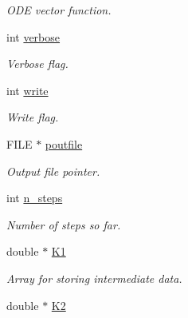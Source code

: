 \begin{DoxyCompactItemize}
\begin{DoxyCompactList}\small\item\em O\+D\+E vector function. \end{DoxyCompactList}\item 
\hypertarget{structrk4_af11a7c143fbea8168fb9d5d5c259e05e}{}int \hyperlink{structrk4_af11a7c143fbea8168fb9d5d5c259e05e}{verbose}\label{structrk4_af11a7c143fbea8168fb9d5d5c259e05e}

\begin{DoxyCompactList}\small\item\em Verbose flag. \end{DoxyCompactList}\item 
\hypertarget{structrk4_a23e792b89a89229f6d7a23190c98d9d8}{}int \hyperlink{structrk4_a23e792b89a89229f6d7a23190c98d9d8}{write}\label{structrk4_a23e792b89a89229f6d7a23190c98d9d8}

\begin{DoxyCompactList}\small\item\em Write flag. \end{DoxyCompactList}\item 
\hypertarget{structrk4_ad2b4a48f52e1ea5206a306827ba717b7}{}F\+I\+L\+E $\ast$ \hyperlink{structrk4_ad2b4a48f52e1ea5206a306827ba717b7}{poutfile}\label{structrk4_ad2b4a48f52e1ea5206a306827ba717b7}

\begin{DoxyCompactList}\small\item\em Output file pointer. \end{DoxyCompactList}\item 
\hypertarget{structrk4_afdb98234387428a832f96e7ccc2ec470}{}int \hyperlink{structrk4_afdb98234387428a832f96e7ccc2ec470}{n\+\_\+steps}\label{structrk4_afdb98234387428a832f96e7ccc2ec470}

\begin{DoxyCompactList}\small\item\em Number of steps so far. \end{DoxyCompactList}\item 
\hypertarget{structrk4_ae34ed14cd80bff2057d6c608e8ee9073}{}double $\ast$ \hyperlink{structrk4_ae34ed14cd80bff2057d6c608e8ee9073}{K1}\label{structrk4_ae34ed14cd80bff2057d6c608e8ee9073}

\begin{DoxyCompactList}\small\item\em Array for storing intermediate data. \end{DoxyCompactList}\item 
\hypertarget{structrk4_a0a27f914e752daa876b07c31afa6babf}{}double $\ast$ \hyperlink{structrk4_a0a27f914e752daa876b07c31afa6babf}{K2}\label{structrk4_a0a27f914e752daa876b07c31afa6babf}


\end{DoxyCompactItemize}
